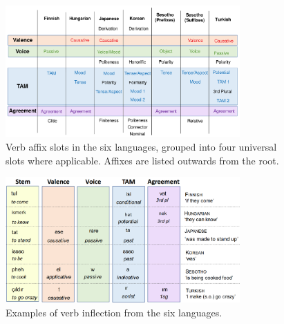 \documentclass[11pt,letterpaper]{article}
\newcommand\mhahn[1]{{\color{red}(#1)}}
\begin{document}
 \begin{figure}
 \begin{center}
 \includegraphics[width=0.8\textwidth]{figures/slots(3).pdf}
 \end{center}
\caption{Verb affix slots in the six languages, grouped into four universal slots where applicable. Affixes are listed outwards from the root. }\label{tab:slots-verbs}
 
 \end{figure}

\begin{figure} 
\begin{center}
\includegraphics[width=0.8\textwidth]{figures/examples-slots.png}
\end{center}
 

\caption{Examples of verb inflection from the six languages. }\label{tab:examples-verbs}
\end{figure}
 
 
\end{document}
